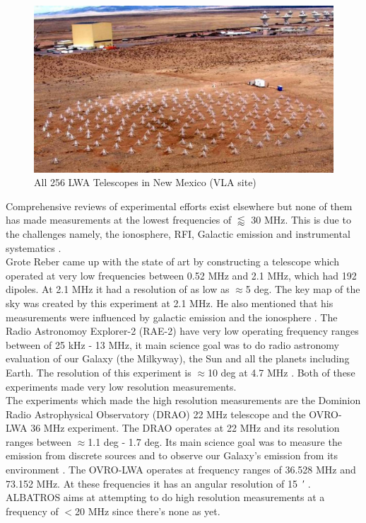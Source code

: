 \documentclass[12pt,a4paper]{report}
\begin{document}
		\begin{figure}[htb]
			\begin{center}
				\includegraphics[width=0.7\linewidth]{Figures/LWA256.jpg}
				\caption{All 256 LWA Telescopes in New Mexico (VLA site) \cite{2012PASP..124.1090H}}
				\label{Fig:LWA256}
			\end{center}
		\end{figure}
		
Comprehensive reviews of experimental efforts exist elsewhere but none of them has made measurements at the lowest frequencies of $\lessapprox$ 30 MHz. This is due to the challenges namely, the ionosphere, RFI, Galactic emission and instrumental systematics \cite{2018arXiv180609531P}. \\

Grote Reber came up with the state of art by constructing a telescope which operated at very low frequencies between 0.52 MHz and 2.1 MHz, which had 192 dipoles. At 2.1 MHz it had a resolution of as low as $\approx$5 deg. The key map of the sky was created by this experiment at 2.1 MHz. He also mentioned that his measurements were influenced by galactic emission and the ionosphere \cite{article, 1988A&A...195..372W}. The Radio Astronomoy Explorer-2 (RAE-2) have very low operating frequency ranges between of 25 kHz - 13 MHz, it main science goal was to do radio astronomy evaluation of our Galaxy (the Milkyway), the Sun and all the planets including Earth. The resolution of this experiment is $\approx$10 deg at 4.7 MHz \cite{1975A&A....40..365A}. Both of these experiments made very low resolution measurements.\\

The experiments which made the high resolution measurements are the  Dominion Radio Astrophysical Observatory (DRAO) 22 MHz telescope and the OVRO-LWA 36 MHz experiment. The DRAO operates at 22 MHz and its resolution ranges between $\approx$1.1 deg - 1.7 deg. Its main science goal was to measure the emission from discrete sources and to observe our Galaxy's emission from its environment \cite{1999A&AS..137....7R}. The OVRO-LWA operates at frequency ranges of 36.528 MHz and 73.152 MHz. At these frequencies it has an angular resolution of \SI{15}{\arcminute} \cite{2018AJ....156...32E}. ALBATROS aims at attempting to do high resolution measurements at a frequency of $<$20 MHz since there's none as yet.
		
\end{document}
